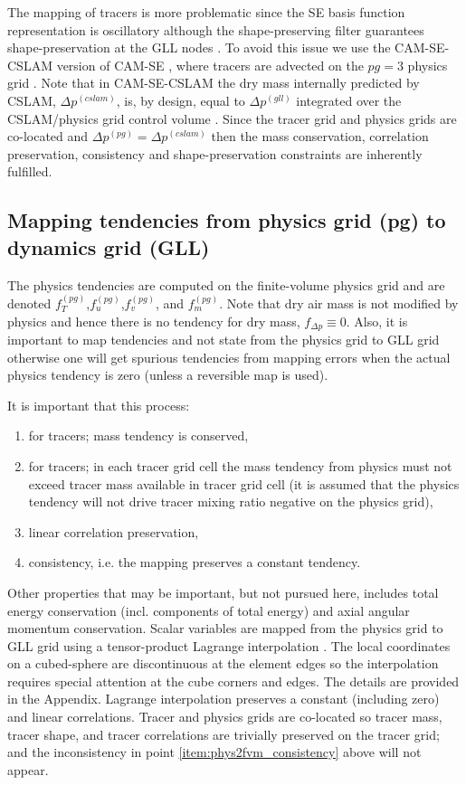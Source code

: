\documentclass[twocol]{ametsoc}
\begin{document}
The mapping of tracers is more problematic since the SE basis function representation is oscillatory although the shape-preserving filter guarantees shape-preservation at the GLL nodes \citep{GTS2014JCP}. To avoid this issue we use the CAM-SE-CSLAM version of CAM-SE \citep[Conservative Semi-Lagrangian Multi-tracer transport scheme][]{LTOUNGK2017MWR}, where tracers are advected on the $pg=3$ physics grid {\color{red}{using the inherently mass and linear-correlation preserving CSLAM algorithm}}. Note that in CAM-SE-CSLAM the dry mass internally predicted by CSLAM, $\Delta p^{(cslam)}$, is, by design, equal to $\Delta p^{(gll)}$ integrated over the CSLAM/physics grid control volume \citep{LTOUNGK2017MWR}. Since the tracer grid and physics grids are co-located and $\Delta p^{(pg)}=\Delta p^{(cslam)}$ then the  mass conservation, correlation preservation, consistency and shape-preservation constraints are inherently fulfilled.
%
\subsection{Mapping tendencies from physics grid (pg) to dynamics grid (GLL)}
The physics tendencies are computed on the finite-volume physics grid and are denoted $f_T^{(pg)}$,$f_u^{(pg)}$,$f_v^{(pg)}$, and $f_m^{(pg)}$. Note that dry air mass is not modified by physics and hence there is no tendency for dry mass,  $f_{\Delta p}\equiv 0$. Also, it is important to map tendencies and not state from the physics grid to GLL grid otherwise one will get spurious tendencies from mapping errors when the actual physics tendency is zero (unless a reversible map is used).

It is important that this process:
\begin{enumerate}
\item for tracers; mass tendency is conserved,
\item for tracers; in each tracer grid cell the mass tendency from physics must not exceed tracer mass available in tracer grid cell (it is assumed that the physics tendency will not drive tracer mixing ratio negative on the physics grid),\label{item:phys2fvm_consistency}
\item linear correlation preservation,
\item consistency, i.e. the mapping preserves a constant tendency.
\end{enumerate}
Other properties that may be important, but not pursued here, includes total energy conservation (incl. components of total energy) and axial angular momentum conservation. Scalar variables are mapped from {\color{red}the{}} physics grid to GLL grid using a tensor-product Lagrange interpolation {\color{red}{in two dimensions (i.e. we assume that the pressure variations in the vertical are small)}}. The local coordinates on a cubed-sphere are discontinuous at the element edges so the interpolation requires special attention at the cube corners and edges. The details are provided in the Appendix. Lagrange interpolation preserves a constant (including zero) and linear correlations. Tracer and physics grids are co-located so tracer mass, tracer shape, and tracer correlations are trivially preserved on the tracer grid; and the inconsistency in point \ref{item:phys2fvm_consistency} above will not appear. 
\end{document}
